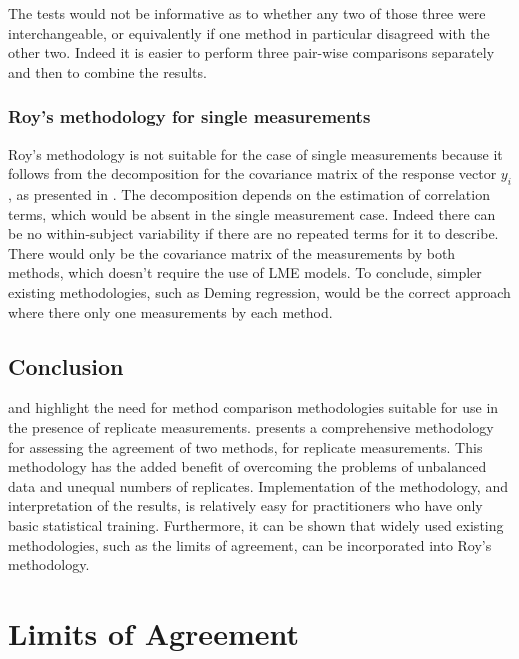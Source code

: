 \documentclass[12pt, a4paper]{report}
\theoremstyle{plain}
\theoremstyle{definition}
\theoremstyle{remark}
\begin{document}
			The tests would not be informative as to whether any two of those three were interchangeable, or equivalently if one method in particular disagreed with the other two. Indeed it is easier to perform three pair-wise comparisons separately and then to combine the results.
			
			
			
			\subsection{Roy's methodology for single measurements}
			
			Roy's methodology is not suitable for the case of single measurements because it follows from the decomposition for the covariance matrix of the response vector $y_{i}$, as presented in \citet{hamlett}. The decomposition depends on the estimation of correlation terms, which would be absent in the single measurement case. Indeed there can be no within-subject variability if there are no repeated terms for it to describe. There would only be the covariance matrix of the measurements by both methods, which doesn't require the use of LME models. To conclude, simpler existing methodologies, such as Deming regression, would be the correct approach where there only one measurements by each method.
			
			
			
			
			
			
			
			
			\section{Conclusion}
			\citet{BXC2008} and \citet{ARoy2009} highlight the need for method comparison methodologies suitable for use in the presence of replicate measurements. \citet{ARoy2009} presents a comprehensive methodology for assessing the agreement of two methods, for replicate measurements. This methodology has the added benefit of overcoming the problems of unbalanced data and unequal numbers of replicates. Implementation of the methodology, and interpretation of the results, is relatively easy for practitioners who have only basic statistical training. Furthermore, it can be shown that widely used existing methodologies, such as the limits of agreement, can be incorporated into Roy's methodology.
			
	\chapter{Limits of Agreement}
	
\end{document}
